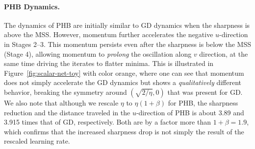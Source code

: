 \paragraph{PHB Dynamics.} 
The dynamics of PHB are initially similar to GD dynamics when the sharpness is above the MSS. However, momentum further accelerates the negative $u$-direction in Stages 2--3. This momentum persists even after the sharpness is below the MSS (Stage 4), allowing momentum to \emph{prolong} the oscillation along $v$ direction, at the same time driving the iterates to flatter minima.
This is illustrated in Figure~\ref{fig:scalar-net-toy} with color {\color{orange} orange}, where one can see that momentum does not simply accelerate the GD dynamics but shows a \emph{qualitatively} different behavior, breaking the symmetry around $(\sqrt{2/\eta}, 0)$ that was present for {\color{blue} GD}.
We also note that although we rescale $\eta$ to $\eta (1 + \beta)$ for {\color{orange} PHB}, the sharpness reduction and the distance traveled in the $u$-direction of PHB is about 3.89 and 3.915 times that of {\color{blue} GD}, respectively.
Both are by a factor more than $1 + \beta = 1.9$, which confirms that the increased sharpness drop is not simply the result of the rescaled learning rate.


